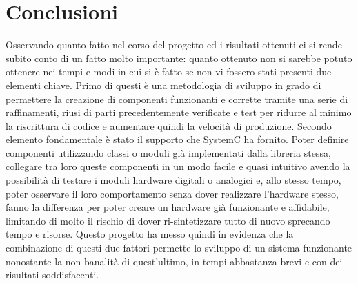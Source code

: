 \documentclass[]{IEEEtran}
\begin{document}
\section{Conclusioni}
Osservando quanto fatto nel corso del progetto ed i risultati ottenuti ci si rende subito conto di un fatto molto importante: quanto ottenuto non si sarebbe potuto ottenere nei tempi e modi in cui si è fatto se non vi fossero stati presenti due elementi chiave. Primo di questi è una metodologia di sviluppo in grado di permettere la creazione di componenti funzionanti e corrette tramite una serie di raffinamenti, riusi di parti precedentemente verificate e test per ridurre al minimo la riscrittura di codice e aumentare quindi la velocità di produzione. Secondo elemento fondamentale è stato il supporto che SystemC ha fornito. Poter definire componenti utilizzando classi o  moduli già implementati dalla libreria stessa, collegare tra loro queste componenti in un modo facile e quasi intuitivo avendo la possibilità di testare i moduli hardware digitali o analogici e, allo stesso tempo, poter osservare il loro comportamento senza dover realizzare l'hardware stesso, fanno la differenza per poter creare un hardware già funzionante e affidabile, limitando di molto il rischio di dover ri-sintetizzare tutto di nuovo sprecando tempo e risorse. Questo progetto ha messo quindi in evidenza che la combinazione di questi due fattori permette lo sviluppo di un sistema funzionante nonostante la non banalità di quest'ultimo, in tempi abbastanza brevi e con dei risultati soddisfacenti.




\end{document}
